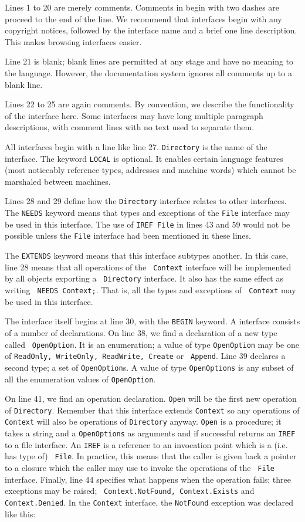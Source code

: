 Lines 1 to 20 are merely comments. Comments in \MIDDL{} begin with two
dashes are proceed to the end of the line. We recommend that
interfaces begin with any copyright notices, followed by the interface
name and a brief one line description. This makes browsing interfaces
easier.

Line 21 is blank; blank lines are permitted at any stage and have no
meaning to the language. However, the \MIDDL{} documentation system
ignores all comments up to a blank line.

Lines 22 to 25 are again comments. By convention, we describe the
functionality of the interface here. Some interfaces may have long
multiple paragraph descriptions, with comment lines with no text used
to separate them.

All interfaces begin with a line like line 27. {\tt Directory} is the
name of the interface. The keyword {\tt LOCAL} is optional. It enables
certain language features (most noticeably reference types, addresses and machine words) which cannot be marshaled between
machines. 

Lines 28 and 29 define how the {\tt Directory} interface relates to
other interfaces. The {\tt NEEDS} keyword means that types and
exceptions of the {\tt File} interface may be used in this
interface. The use of {\tt IREF File} in lines 43 and 59 would not be
possible unless the {\tt File} interface had been mentioned in these
lines. 

The {\tt EXTENDS} keyword means that this interface subtypes
another. In this case, line 28 means that all operations of the {\tt
Context} interface will be implemented by all objects exporting a {\tt
Directory} interface. It also has the same effect as writing {\tt
NEEDS Context;}. That is, all the types and exceptions of {\tt
Context} may be used in this interface.

The interface itself begins at line 30, with the {\tt BEGIN}
keyword. A \MIDDL{} interface consists of a number of declarations. On
line 38, we find a declaration of a new type called {\tt
OpenOption}. It is an enumeration; a value of type {\tt OpenOption}
may be one of {\tt ReadOnly, WriteOnly, ReadWrite, Create} or {\tt
Append}. Line 39 declares a second type; a set of {\tt OpenOption}s. A
value of type {\tt OpenOptions} is any subset of all the enumeration
values of {\tt OpenOption}.

On line 41, we find an operation declaration. {\tt Open} will be the
first new operation of {\tt Directory}. Remember that this interface
extends {\tt Context} so any operations of {\tt Context} will also be
operations of {\tt Directory} anyway. {\tt Open} is a procedure; it
takes a string and a {\tt OpenOptions} as arguments and if successful
returns an {\tt IREF} to a file interface. An {\tt IREF} is a
reference to an invocation point which is a (i.e. has type of) {\tt
File}. In practice, this means that the caller is given back a pointer to a
closure which the caller may use to invoke the operations of the {\tt
File} interface. Finally, line 44 specifies what happens when the
operation fails; three exceptions may be raised; {\tt
Context.NotFound, Context.Exists} and {\tt Context.Denied}. In the
{\tt Context} interface, the {\tt NotFound} exception was declared
like this:

